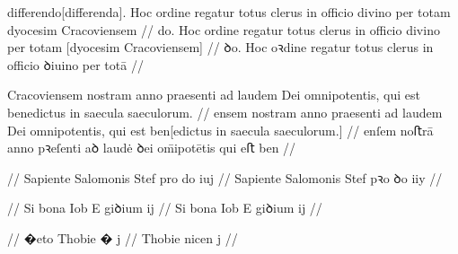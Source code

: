 \ex \bg
\gla
{} differendo[differenda].
Hoc ordine regatur totus clerus in officio divino per totam dyocesim
Cracoviensem
//
\glRekonstrukcja
{} \relax[differen]do.
Hoc ordine regatur totus clerus in officio divino per totam [dyocesim
Cracoviensem]
//
\glU
{}
ꝺo. Hoc oꝛdine regatur totus clerus in oﬀicio ꝺiuino per totā  
//
\endgl
\xe

\ex \bg
\gla
{} Cracoviensem nostram anno praesenti ad laudem Dei omnipotentis, qui
est benedictus in saecula saeculorum.
//
\glRekonstrukcja
{} \relax[Cracovi]ensem nostram anno praesenti ad laudem Dei omnipotentis, qui
est ben[edictus in saecula saeculorum.]
//
\glU
{}
enſem noﬅrā anno pꝛeſenti aꝺ laudė ꝺei om̄ipotētis qui eﬅ ben   
//
\endgl
\xe

\ex \bg
\gla
{} {} {} {} {} {} {} {} {} {}
{} {} {} {} {} {} {} {} {} {}
//
\glRekonstrukcja
{} Sapiente Salomonis Stef pro do iuj
//
\glU
{}
Sapiente Salomonis Stef pꝛo ꝺo iiy
//
\endgl
\xe

\ex \bg
\gla
{} {} {} {} {} {} {} {} {} {}
{} {} {} {} {} {} {} {} {} {}
//
\glRekonstrukcja
{} Si bona Iob E giꝺium ij
//
\glU
{}
Si bona Iob E giꝺium ij
//
\endgl
\xe

\ex \bg
\gla
{} {} {} {} {} {} {} {} {} {}
{} {} {} {} {} {} {} {} {} {}
//
\glRekonstrukcja
{} �eto Thobie � j
//
\glU
{}
{} Thobie nicen j
//
\endgl
\xe

\endinput






